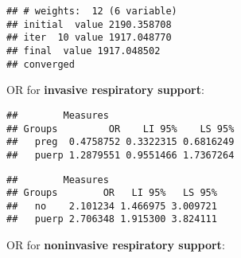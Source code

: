 \documentclass[
]{article}
\newenvironment{Shaded}{\begin{snugshade}}{\end{snugshade}}
\newcommand{\CommentTok}[1]{\textcolor[rgb]{0.56,0.35,0.01}{\textit{#1}}}
\newcommand{\KeywordTok}[1]{\textcolor[rgb]{0.13,0.29,0.53}{\textbf{#1}}}
\newcommand{\NormalTok}[1]{#1}
\newcommand{\OperatorTok}[1]{\textcolor[rgb]{0.81,0.36,0.00}{\textbf{#1}}}
\newcommand{\StringTok}[1]{\textcolor[rgb]{0.31,0.60,0.02}{#1}}
\begin{document}
\begin{verbatim}
## # weights:  12 (6 variable)
## initial  value 2190.358708 
## iter  10 value 1917.048770
## final  value 1917.048502 
## converged
\end{verbatim}

\begin{Shaded}
\end{Shaded}

OR for \textbf{invasive respiratory support}:

\begin{Shaded}
\end{Shaded}

\begin{verbatim}
##        Measures
## Groups         OR    LI 95%    LS 95%
##   preg  0.4758752 0.3322315 0.6816249
##   puerp 1.2879551 0.9551466 1.7367264
\end{verbatim}

\begin{Shaded}
\end{Shaded}

\begin{verbatim}
##        Measures
## Groups        OR   LI 95%   LS 95%
##   no    2.101234 1.466975 3.009721
##   puerp 2.706348 1.915300 3.824111
\end{verbatim}

OR for \textbf{noninvasive respiratory support}:

\begin{Shaded}
\end{Shaded}
\end{document}
